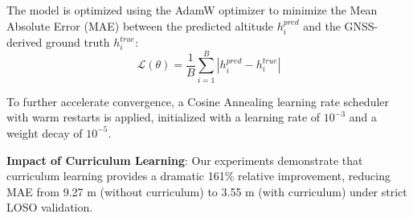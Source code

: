 The model is optimized using the AdamW optimizer \cite{loshchilov2017decoupled} to minimize the Mean Absolute Error (MAE) between the predicted altitude $h^{pred}_i$ and the GNSS-derived ground truth $h^{true}_i$:
\begin{equation}
\mathcal{L}(\theta) = \frac{1}{B} \sum_{i=1}^B \left| h^{pred}_i - h^{true}_i \right|
\label{eq:loss_function}
\end{equation}

To further accelerate convergence, a Cosine Annealing learning rate scheduler with warm restarts \cite{loshchilov2016sgdr} is applied, initialized with a learning rate of $10^{-3}$ and a weight decay of $10^{-5}$.

\textbf{Impact of Curriculum Learning}: Our experiments demonstrate that curriculum learning provides a dramatic 161\% relative improvement, reducing MAE from 9.27 m (without curriculum) to 3.55 m (with curriculum) under strict LOSO validation.
